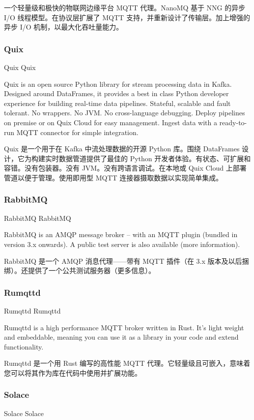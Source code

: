 \documentclass{ctexbook}
\begin{document}
一个轻量级和极快的物联网边缘平台 MQTT 代理。NanoMQ 基于 NNG 的异步 I/O 线程模型。在协议层扩展了 MQTT 支持，并重新设计了传输层。加上增强的异步 I/O 机制，以最大化吞吐量能力。

\subsubsection{Quix}
Quix Quix

Quix is an open source Python library for stream processing data in Kafka. Designed around DataFrames, it provides a best in class Python developer experience for building real-time data pipelines. Stateful, scalable and fault tolerant. No wrappers. No JVM. No cross-language debugging. Deploy pipelines on premise or on Quix Cloud for easy management. Ingest data with a ready-to-run MQTT connector for simple integration.

Quix 是一个用于在 Kafka 中流处理数据的开源 Python 库。围绕 DataFrames 设计，它为构建实时数据管道提供了最佳的 Python 开发者体验。有状态、可扩展和容错。没有包装器。没有 JVM。没有跨语言调试。在本地或 Quix Cloud 上部署管道以便于管理。使用即用型 MQTT 连接器摄取数据以实现简单集成。

\subsubsection{RabbitMQ}
RabbitMQ RabbitMQ

RabbitMQ is an AMQP message broker – with an MQTT plugin (bundled in version 3.x onwards). A public test server is also available (more information).

RabbitMQ 是一个 AMQP 消息代理——带有 MQTT 插件（在 3.x 版本及以后捆绑）。还提供了一个公共测试服务器（更多信息）。

\subsubsection{Rumqttd}
Rumqttd Rumqttd

Rumqttd is a high performance MQTT broker written in Rust. It's light weight and embeddable, meaning you can use it as a library in your code and extend functionality.

Rumqttd 是一个用 Rust 编写的高性能 MQTT 代理。它轻量级且可嵌入，意味着您可以将其作为库在代码中使用并扩展功能。

\subsubsection{Solace}
Solace Solace
\end{document}

